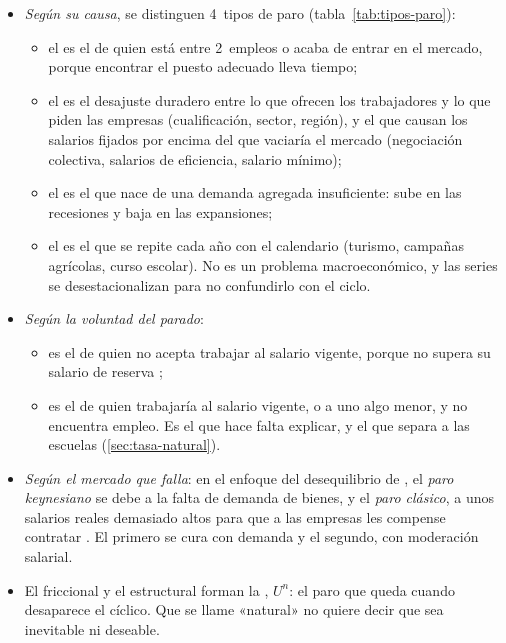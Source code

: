 \documentclass[11pt]{article}
\begin{document}
\begin{itemize}
\item \emph{Según su causa}, se distinguen 4~tipos de paro (tabla~\ref{tab:tipos-paro}):
  \begin{itemize}
  \item el  es el de quien está entre 2~empleos o acaba de entrar en el mercado, porque encontrar el puesto adecuado lleva tiempo;
  \item el  es el desajuste duradero entre lo que ofrecen los trabajadores y lo que piden las empresas (cualificación, sector, región), y el que causan los salarios fijados por encima del que vaciaría el mercado (negociación colectiva, salarios de eficiencia, salario mínimo);
  \item el  es el que nace de una demanda agregada insuficiente: sube en las recesiones y baja en las expansiones;
  \item el  es el que se repite cada año con el calendario (turismo, campañas agrícolas, curso escolar). No es un problema macroeconómico, y las series se desestacionalizan para no confundirlo con el ciclo.
  \end{itemize}
\item \emph{Según la voluntad del parado}:
  \begin{itemize}
  \item es  el de quien no acepta trabajar al salario vigente, porque no supera su salario de reserva ;
  \item es  el de quien trabajaría al salario vigente, o a uno algo menor, y no encuentra empleo. Es el que hace falta explicar, y el que separa a las escuelas (\ref{sec:tasa-natural}).
  \end{itemize}
\item \emph{Según el mercado que falla}: en el enfoque del desequilibrio de , el \emph{paro keynesiano} se debe a la falta de demanda de bienes, y el \emph{paro clásico}, a unos salarios reales demasiado altos para que a las empresas les compense contratar . El primero se cura con demanda y el segundo, con moderación salarial.
\item El friccional y el estructural forman la , $U^n$: el paro que queda cuando desaparece el cíclico. Que se llame «natural» no quiere decir que sea inevitable ni deseable.
\end{itemize}
\end{document}
